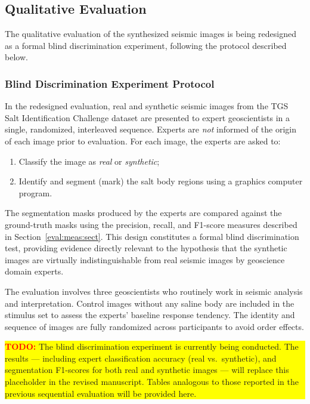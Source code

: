 \documentclass{ieeeaccess}
\begin{document}
\subsection{Qualitative Evaluation}

The qualitative evaluation of the synthesized seismic images is being redesigned as a formal blind discrimination experiment, following the protocol described below.

\subsubsection{Blind Discrimination Experiment Protocol}

In the redesigned evaluation, real and synthetic seismic images from the TGS Salt Identification Challenge dataset are presented to expert geoscientists in a single, randomized, interleaved sequence. Experts are \emph{not} informed of the origin of each image prior to evaluation. For each image, the experts are asked to:
\begin{enumerate}
    \item Classify the image as \emph{real} or \emph{synthetic};
    \item Identify and segment (mark) the salt body regions using a graphics computer program.
\end{enumerate}
The segmentation masks produced by the experts are compared against the ground-truth masks using the precision, recall, and F1-score measures described in Section~\ref{eval:meas:sect}. This design constitutes a formal blind discrimination test, providing evidence directly relevant to the hypothesis that the synthetic images are virtually indistinguishable from real seismic images by geoscience domain experts.

The evaluation involves three geoscientists who routinely work in seismic analysis and interpretation. Control images without any saline body are included in the stimulus set to assess the experts' baseline response tendency. The identity and sequence of images are fully randomized across participants to avoid order effects.

\bigskip
\noindent\colorbox{yellow}{\parbox{0.97\linewidth}{%
\textcolor{red}{\textbf{TODO:}} The blind discrimination experiment is currently being conducted. The results — including expert classification accuracy (real vs.\ synthetic), and segmentation F1-scores for both real and synthetic images — will replace this placeholder in the revised manuscript. Tables analogous to those reported in the previous sequential evaluation will be provided here.
}}
\bigskip
\end{document}

